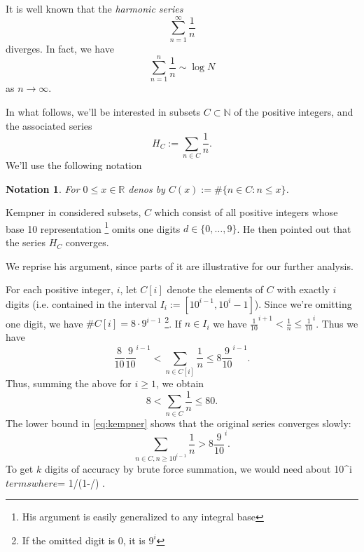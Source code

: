 \documentclass{article}
\newtheorem{notation}[section]{Notation}
\begin{document}
It is well known that the \emph{harmonic series}
\begin{displaymath}
  \sum_{n=1}^\infty \frac{1}{n}
\end{displaymath}
diverges. In fact, we have
\begin{displaymath}
  \sum_{n=1}^n \frac{1}{n} \sim \log N
\end{displaymath}
as $n \rightarrow \infty$.

In what follows, we'll be interested in subsets $C \subset \mathbb{N}$
of the positive integers, and the associated series
\begin{equation}
  \label{eq:harmonic}
  H_C := \sum_{n \in C} \frac{1}{n}.
\end{equation}
We'll use the following notation
\begin{notation}
  For $0 \le x \in \mathbb{R}$ denos by $C(x) := \#\{n \in C: n \le x\}$.
\end{notation}

Kempner in \cite{kempner1914curious}
considered subsets, $C$ which consist of all positive integers whose
base 10 representation
\footnote{His
  argument is easily generalized to any integral base}
omits one digits $d \in \{0,\dots,9\}$. He then
pointed out that the series $H_C$ converges.

We reprise his argument, since parts of it are illustrative for our
further analysis.

For each positive integer, $i$, let $C[i]$ denote the elements of
$C$ with exactly $i$ digits (i.e. contained in the interval $I_i :=
[10^{i-1}, 10^i -1]$).
Since we're omitting one digit, we have $\# C[i] = 8\cdot 9^{i-1}$
\footnote{If the omitted digit is 0, it is $9^i$}. If $n\in I_i$ we
have $\frac{1}{10}^{i+1} < \frac{1}{n} \le \frac{1}{10}^i$.
Thus we have
\begin{equation}
\label{eq:kempner}
\frac{8}{10} \frac{9}{10}^{i-1} < \sum_{n \in C[i]} \frac{1}{n} \le 8\frac{9}{10}^{i-1}.
\end{equation}
Thus, summing the above for $i\ge 1$, we obtain
\begin{displaymath}
  8 < \sum_{n \in C} \frac{1}{n} \le 80.
\end{displaymath}
The lower bound in \eqref{eq:kempner} shows that the original series
converges slowly:
\begin{displaymath}
  \sum_{n \in C, n \ge 10^{i-1}} \frac{1}{n} > 8 \frac{9}{10}^i.
\end{displaymath}
To get $k$ digits of accuracy by brute force summation, we would need
about 10^{\alpha i}$ terms where $\alpha = 1/(1-/)
.
\end{document}
